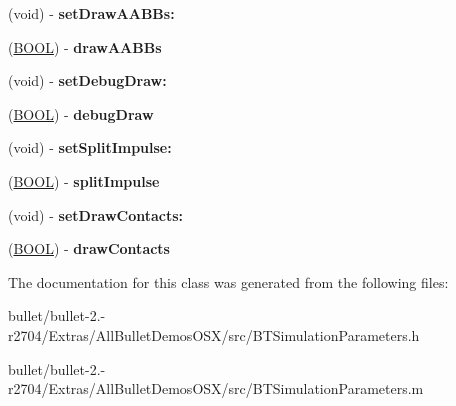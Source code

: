 \begin{DoxyCompactItemize}
\item 
\hypertarget{interface_b_t_simulation_parameters_aec374459d1faf16be0b5109d060b6e94}{(void) -\/ {\bfseries set\+Draw\+A\+A\+B\+Bs\+:}}\label{interface_b_t_simulation_parameters_aec374459d1faf16be0b5109d060b6e94}

\item 
\hypertarget{interface_b_t_simulation_parameters_a6a63c2fca6a65b554bc2dd3e3d560167}{(\hyperlink{_ice_types_8h_a050c65e107f0c828f856a231f4b4e788}{B\+O\+O\+L}) -\/ {\bfseries draw\+A\+A\+B\+Bs}}\label{interface_b_t_simulation_parameters_a6a63c2fca6a65b554bc2dd3e3d560167}

\item 
\hypertarget{interface_b_t_simulation_parameters_a7ca9181c7846973fd53ceef2f72e742b}{(void) -\/ {\bfseries set\+Debug\+Draw\+:}}\label{interface_b_t_simulation_parameters_a7ca9181c7846973fd53ceef2f72e742b}

\item 
\hypertarget{interface_b_t_simulation_parameters_a1bbeaac898884f01f28a32ca6a1ff82f}{(\hyperlink{_ice_types_8h_a050c65e107f0c828f856a231f4b4e788}{B\+O\+O\+L}) -\/ {\bfseries debug\+Draw}}\label{interface_b_t_simulation_parameters_a1bbeaac898884f01f28a32ca6a1ff82f}

\item 
\hypertarget{interface_b_t_simulation_parameters_a0b1324e3ec78632978a9ace7e57be582}{(void) -\/ {\bfseries set\+Split\+Impulse\+:}}\label{interface_b_t_simulation_parameters_a0b1324e3ec78632978a9ace7e57be582}

\item 
\hypertarget{interface_b_t_simulation_parameters_ad521f51c33a921738acc68dce0ba07d6}{(\hyperlink{_ice_types_8h_a050c65e107f0c828f856a231f4b4e788}{B\+O\+O\+L}) -\/ {\bfseries split\+Impulse}}\label{interface_b_t_simulation_parameters_ad521f51c33a921738acc68dce0ba07d6}

\item 
\hypertarget{interface_b_t_simulation_parameters_ad298fcb0d25f334a0bbd84419213dae1}{(void) -\/ {\bfseries set\+Draw\+Contacts\+:}}\label{interface_b_t_simulation_parameters_ad298fcb0d25f334a0bbd84419213dae1}

\item 
\hypertarget{interface_b_t_simulation_parameters_a208adf9c8d14013ee54e5480c4a13d3a}{(\hyperlink{_ice_types_8h_a050c65e107f0c828f856a231f4b4e788}{B\+O\+O\+L}) -\/ {\bfseries draw\+Contacts}}\label{interface_b_t_simulation_parameters_a208adf9c8d14013ee54e5480c4a13d3a}

\end{DoxyCompactItemize}


The documentation for this class was generated from the following files\+:\begin{DoxyCompactItemize}
\item 
bullet/bullet-\/2.-\/r2704/\+Extras/\+All\+Bullet\+Demos\+O\+S\+X/src/B\+T\+Simulation\+Parameters.\+h\item 
bullet/bullet-\/2.-\/r2704/\+Extras/\+All\+Bullet\+Demos\+O\+S\+X/src/B\+T\+Simulation\+Parameters.\+m\end{DoxyCompactItemize}
